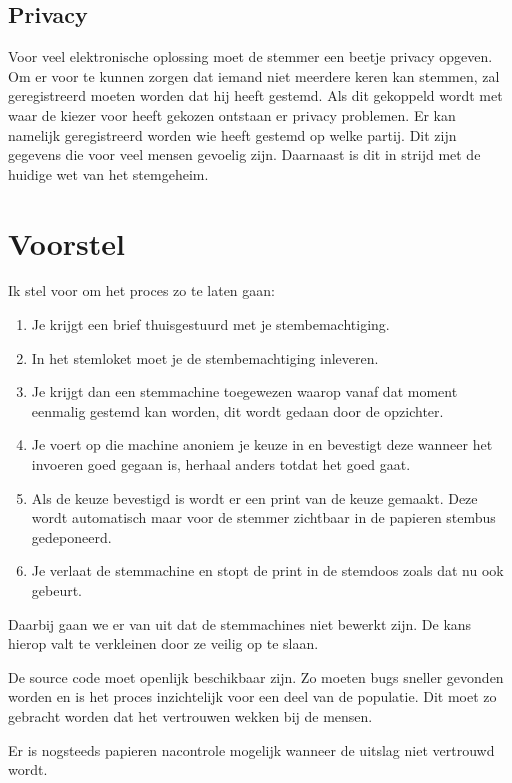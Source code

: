 \documentclass[a4paper]{article}
\begin{document}
\subsection{Privacy}
Voor veel elektronische oplossing moet de stemmer een beetje privacy opgeven.
Om er voor te kunnen zorgen dat iemand niet meerdere keren kan stemmen, zal geregistreerd moeten worden dat hij heeft gestemd. 
Als dit gekoppeld wordt met waar de kiezer voor heeft gekozen ontstaan er privacy problemen.
Er kan namelijk geregistreerd worden wie heeft gestemd op welke partij. 
Dit zijn gegevens die voor veel mensen gevoelig zijn.
Daarnaast is dit in strijd met de huidige wet van het stemgeheim.

\newpage


\section{Voorstel}

Ik stel voor om het proces zo te laten gaan:

\begin{enumerate}
\item Je krijgt een brief thuisgestuurd met je stembemachtiging. 
\item In het stemloket moet je de stembemachtiging inleveren. 
\item Je krijgt dan een stemmachine toegewezen waarop vanaf dat moment  eenmalig gestemd kan worden, dit wordt gedaan door de opzichter. 
\item Je voert op die machine anoniem je keuze in en bevestigt deze wanneer het invoeren goed gegaan is, herhaal anders totdat het goed gaat.
\item Als de keuze bevestigd is wordt er een print van de keuze gemaakt. Deze wordt automatisch maar voor de stemmer zichtbaar in de papieren stembus gedeponeerd. 
\item Je verlaat de stemmachine en stopt de print in de stemdoos zoals dat nu ook gebeurt. 
\end{enumerate}

Daarbij gaan we er van uit dat de stemmachines niet bewerkt zijn. De kans hierop valt te verkleinen door ze veilig op te slaan. 

De source code moet openlijk beschikbaar zijn. Zo moeten bugs sneller gevonden worden en is het proces inzichtelijk voor een deel van de populatie. Dit moet zo gebracht worden dat het vertrouwen wekken bij de mensen. 

Er is nogsteeds papieren nacontrole mogelijk wanneer de uitslag niet vertrouwd wordt. 
\end{document}
